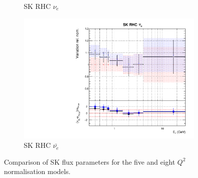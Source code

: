\begin{figure}
\begin{subfigure}{0.45\textwidth}
  \caption{SK RHC $\nu_{e}$}
\end{subfigure}
\begin{subfigure}{0.45\textwidth}
  \centering
  \includegraphics[width=0.75\linewidth]{figs/comp5q2vs8q2flux15}
  \caption{SK RHC $\bar{\nu_e}$}
\end{subfigure}
\caption{Comparison of SK flux parameters for the five and eight $Q^2$ normalisation models.}
\label{fig:comp5q2vs8q2fluxSK}
\end{figure}

